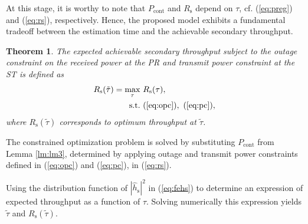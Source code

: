 \documentclass[12pt, draftclsnofoot, onecolumn]{IEEEtran}
\newcommand{\e}[2]{{\mathbb E}_{#1}\left[ #2 \right]}
\newcommand{\p}{\mathbb P}
\newcommand{\sub}[1]{_{\text{#1}}}
\newcommand{\opc}{\rho\sub{out}}
\newcommand{\pc}{\rho\sub{cont}}
\newcommand{\preg}{P\sub{cont}}
\newcommand{\eprcvd}{\hat{P}\sub{rcvd}}
\newcommand{\ptran}{P\sub{tran}}
\newcommand{\pp}{P\sub{p}}
\newcommand{\ite}{\theta\sub{I}}
\newcommand{\rs}{R\sub{s}}
\newcommand{\trs}{R\sub{s}}
\newcommand{\ers}{\e{}{\rs}}
\newcommand{\gp}{h\sub{p}}
\newcommand{\epgs}{|\hat{h}\sub{s}|^2}
\newcommand{\gs}{h\sub{s}}
\newcommand{\nps}{\sigma^2}
\newcommand{\ttau}{\tilde{\tau}}
\newcommand{\drs}{f_{\rs}}
\DeclareMathOperator*{\maxi}{max}
\newtheorem{theorem}{Theorem}
\begin{document}
At this stage, it is worthy to note that $\preg$ and $\trs$ depend on $\tau$, cf. (\ref{eq:preg}) and (\ref{eq:rs}), respectively. Hence, the proposed model exhibits a fundamental tradeoff between the estimation time and the achievable secondary throughput.  
\begin{theorem} \label{th:th1}
\normalfont
The expected achievable secondary throughput subject to the outage constraint on the received power at the PR and transmit power constraint at the ST is defined as
\begin{align}
\trs(\ttau) = \maxi_{\tau}  & \text{      } {\rs(\tau)}, 
 \label{eq:sys} \\
\text{s.t.} & \text{ } (\ref{eq:opc}), \text{  } (\ref{eq:pc}), \nonumber 
 \end{align}
where $\trs(\ttau)$ corresponds to optimum throughput at $\ttau$.  
\end{theorem}
\begin{IEEEproof}
The constrained optimization problem is solved by substituting $\preg$ from Lemma \ref{lm:lm3}, determined by applying outage and transmit power constraints defined in (\ref{eq:opc}) and (\ref{eq:pc}), in (\ref{eq:rs}). 

Using the distribution function of $\epgs$ in (\ref{eq:fehs}) to determine an expression of expected throughput as a function of $\tau$. Solving numerically this expression yields $\ttau$ and $\trs(\ttau)$. 
\end{IEEEproof}

\end{document}
